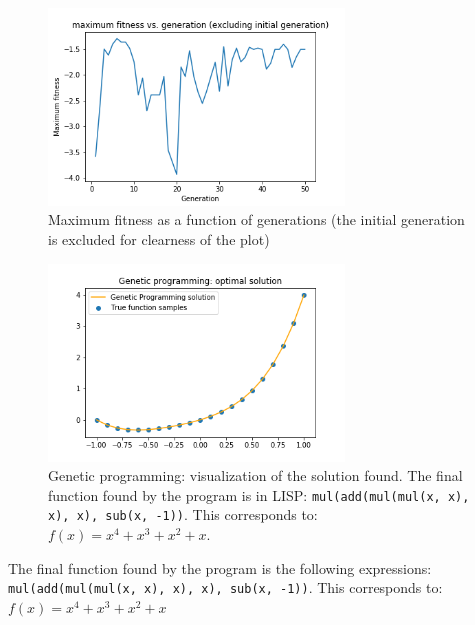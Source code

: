 \documentclass{article}
\begin{document}
    
     \begin{figure}[H]
        \centering
        \includegraphics[width=0.7\textwidth]{Assignment 1/Figures/A1_8a2.png}
        \caption{Maximum fitness as a function of generations (the initial generation is excluded for clearness of the plot)}
        \label{fig:A1_8a2}
    \end{figure}
    
     \begin{figure}[H]
        \centering
        \includegraphics[width=0.7\textwidth]{Assignment 1/Figures/A1_8a3.png}
        \caption{Genetic programming: visualization of the solution found. The final function found by the program is in LISP: \texttt{mul(add(mul(mul(x, x), x), x), sub(x, -1))}. This corresponds to: $f(x) = x^4+x^3+x^2+x$.}
        \label{fig:A1_8a3}
    \end{figure}
 The final function found by the program is the following expressions: \texttt{mul(add(mul(mul(x, x), x), x), sub(x, -1))}. This corresponds to: $f(x) = x^4+x^3+x^2+x$ 
\end{document}
